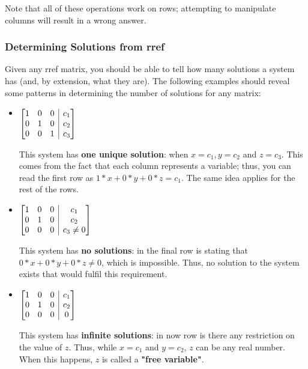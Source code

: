 \documentclass[12pt]{article}
\begin{document}
Note that all of these operations work on rows; attempting to manipulate columns will result in a wrong answer. 

\subsubsection{Determining Solutions from rref}

Given any rref matrix, you should be able to tell how many solutions a system has (and, by extension, what they are). The following examples should reveal some patterns in determining the number of solutions for any matrix:

\begin{itemize}
    \item 
    $
    \begin{array}[t][{@{}ccc|c@{}}]
     1 & 0 & 0 & c_1 \\
     0 & 1 & 0 & c_2 \\
     0 & 0 & 1 & c_3 \\
    \end{array}\
    $
    
    This system has \textbf{one unique solution}: when $x = c_1, y = c_2$ and $z = c_3$. This comes from the fact that each column represents a variable; thus, you can read the first row as $1*x+0*y+0*z = c_1$. The same idea applies for the rest of the rows.
    \item 
    $
    \begin{array}[t][{@{}ccc|c@{}}]
     1 & 0 & 0 & c_1 \\
     0 & 1 & 0 & c_2 \\
     0 & 0 & 0 & c_3 \neq 0 \\
    \end{array}\
    $
    
    This system has \textbf{no solutions}: in the final row is stating that $0*x+0*y+0*z \neq 0$, which is impossible. Thus, no solution to the system exists that would fulfil this requirement.
    \item 
    $
    \begin{array}[t][{@{}ccc|c@{}}]
     1 & 0 & 0 & c_1 \\
     0 & 1 & 0 & c_2 \\
     0 & 0 & 0 & 0 \\
    \end{array}\
    $
    
    This system has \textbf{infinite solutions}: in now row is there any restriction on the value of $z$. Thus, while $x = c_1$ and $y = c_2$, $z$ can be any real number. When this happens, $z$ is called a \textbf{"free variable"}. 
     

\end{itemize}
\end{document}
